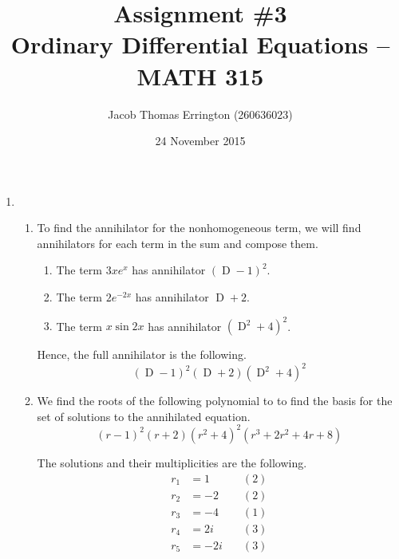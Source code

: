 \documentclass[letterpaper,11pt]{article}
\author{Jacob Thomas Errington (260636023)}
\title{Assignment \#3\\Ordinary Differential Equations -- MATH 315}
\date{24 November 2015}
\DeclareMathOperator{\D}{D}
\begin{document}
\maketitle

\begin{enumerate}
    \item
        \begin{enumerate}
            \item
                To find the annihilator for the nonhomogeneous term, we will
                find annihilators for each term in the sum and compose them.

                \begin{enumerate}
                    \item
                        The term $3xe^x$ has annihilator $(\D{} - 1)^2$.

                    \item
                        The term $2e^{-2x}$ has annihilator $\D{} + 2$.

                    \item
                        The term $x \sin{2x}$ has annihilator $(\D^2{} + 4)^2$.
                \end{enumerate}

                Hence, the full annihilator is the following.
                $$
                (\D{} - 1)^2 (\D{} + 2)(\D^2{} + 4)^2
                $$

            \item
                We find the roots of the following polynomial to to find the
                basis for the set of solutions to the annihilated equation.
                $$
                (r - 1)^2 (r + 2) (r^2 + 4)^2 (r^3 + 2 r^2 + 4r + 8)
                $$

                The solutions and their multiplicities are the following.
                \begin{align*}
                    r_1 &=  1  &\quad (2)\\
                    r_2 &= -2  &\quad (2)\\
                    r_3 &= -4  &\quad (1)\\
                    r_4 &=  2i &\quad (3)\\
                    r_5 &= -2i &\quad (3)
                \end{align*}


\end{enumerate}
\end{enumerate}
\end{document}
